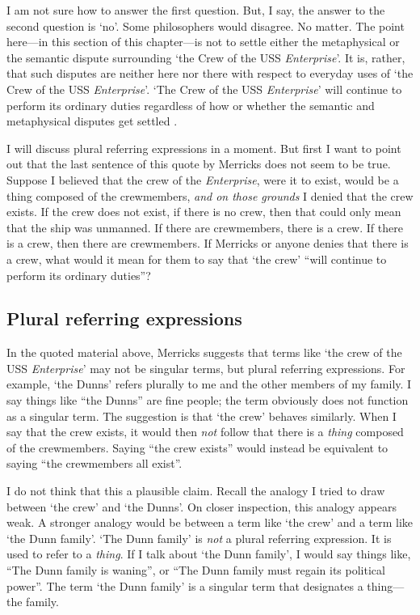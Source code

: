 \documentclass[11pt]{article}
\newenvironment{squote}{%
\begin{spacing}{1}
       	\begin{list}{}{%
\setlength{\labelwidth}{0pt}%
\rightmargin\leftmargin%
}
\item\relax
}{%
\end{list}%
\end{spacing}
}
\begin{document}
\begin{spacing}{1.25}
\begin{squote}
I am not sure how to answer the first question.  But, I say, the
answer to the second question is `no'.  Some philosophers would
disagree.  No matter.  The point here---in this section of this
chapter---is not to settle either the metaphysical or the semantic
dispute surrounding `the Crew of the USS {\em Enterprise}'.  It is,
rather, that such disputes are neither here nor there with respect to
everyday uses of `the Crew of the USS {\em Enterprise}'.  `The Crew of
the USS {\em Enterprise}' will continue to perform its ordinary duties
regardless of how or whether the semantic and metaphysical disputes
get settled \citeyearpar[10]{merricks2001a}.
\end{squote}

I will discuss plural referring expressions in a moment.  But first I
want to point out that the last sentence of this quote by Merricks
does not seem to be true.  Suppose I believed that the crew of the
{\em Enterprise}, were it to exist, would be a thing composed of the
crewmembers, {\em and on those grounds} I denied that the crew exists.
If the crew does not exist, if there is no crew, then that could only
mean that the ship was unmanned.  If there are crewmembers, there is a
crew.  If there is a crew, then there are crewmembers.  If Merricks or
anyone denies that there is a crew, what would it mean for them to say
that `the crew' ``will continue to perform its ordinary duties''?

\subsection{Plural referring expressions}
In the quoted material above, Merricks suggests that terms like `the
crew of the USS {\em Enterprise}' may not be singular terms, but
plural referring expressions.  For example, `the Dunns' refers
plurally to me and the other members of my family.  I say things like
``the Dunns'' are fine people; the term obviously does not function as
a singular term.  The suggestion is that `the crew' behaves similarly.
When I say that the crew exists, it would then {\em not} follow that
there is a {\em thing} composed of the crewmembers.  Saying ``the crew
exists'' would instead be equivalent to saying ``the crewmembers all
exist''.

I do not think that this a plausible claim.  Recall the analogy I
tried to draw between `the crew' and `the Dunns'.  On closer
inspection, this analogy appears weak.  A stronger analogy would be
between a term like `the crew' and a term like `the Dunn family'.
`The Dunn family' is {\em not} a plural referring expression.  It is
used to refer to a {\em thing}.  If I talk about `the Dunn family', I
would say things like, ``The Dunn family is waning'', or ``The Dunn
family must regain its political power''.  The term `the Dunn family'
is a singular term that designates a thing---the family.


\end{spacing}
\end{document}
